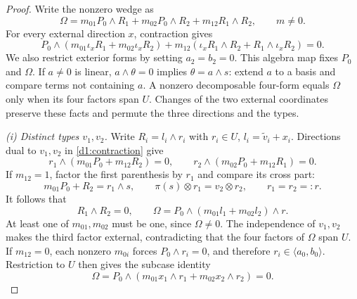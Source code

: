 \documentclass[11pt,a4paper]{article}
\theoremstyle{plain}
\theoremstyle{remark}
\begin{document}
\begin{proof}
Write the nonzero wedge as
\[
\Omega=m_{01}P_0\wedge R_1+m_{02}P_0\wedge R_2+m_{12}R_1\wedge R_2,\qquad m\ne0.
\]
For every external direction $x$, contraction gives
\begin{equation}\label{d1:contraction}
P_0\wedge(m_{01}\iota_xR_1+m_{02}\iota_xR_2)
+m_{12}(\iota_xR_1\wedge R_2+R_1\wedge\iota_xR_2)=0.
\end{equation}
We also restrict exterior forms by setting $a_2=b_2=0$. This algebra map fixes $P_0$ and $\Omega$. If $a\ne0$ is linear, $a\wedge\theta=0$ implies $\theta=a\wedge s$: extend $a$ to a basis and compare terms not containing $a$. A nonzero decomposable four-form equals $\Omega$ only when its four factors span $U$. Changes of the two external coordinates preserve these facts and permute the three directions and the types.

\emph{(i) Distinct types $v_1,v_2$.} Write $R_i=l_i\wedge r_i$ with $r_i\in U$, $l_i=\widetilde v_i+x_i$. Directions dual to $v_1,v_2$ in \eqref{d1:contraction} give
\[
r_1\wedge(m_{01}P_0+m_{12}R_2)=0,\qquad
r_2\wedge(m_{02}P_0+m_{12}R_1)=0.
\]
If $m_{12}=1$, factor the first parenthesis by $r_1$ and compare its cross part:
\[
m_{01}P_0+R_2=r_1\wedge s,\qquad
\pi(s)\otimes r_1=v_2\otimes r_2,\qquad r_1=r_2=:r.
\]
It follows that
\[
R_1\wedge R_2=0,\qquad
\Omega=P_0\wedge(m_{01}l_1+m_{02}l_2)\wedge r.
\]
At least one of $m_{01},m_{02}$ must be one, since $\Omega\ne0$. The independence of $v_1,v_2$ makes the third factor external, contradicting that the four factors of $\Omega$ span $U$.
If $m_{12}=0$, each nonzero $m_{0i}$ forces $P_0\wedge r_i=0$, and therefore $r_i\in\langle a_0,b_0\rangle$. Restriction to $U$ then gives the subcase identity
\[
\Omega=P_0\wedge(m_{01}x_1\wedge r_1+m_{02}x_2\wedge r_2)=0.
\]


\end{proof}
\end{document}

